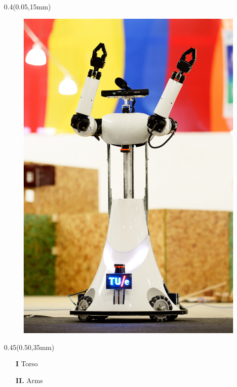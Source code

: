 \documentclass[aspectratio=43]{beamer}
\newcommand{\TULeftMargin}{0.05\paperwidth}
\newcommand{\TULeftWidth}{0.4\paperwidth}
\newcommand{\TURightMargin}{0.50\paperwidth}
\newcommand{\TURightWidth}{0.45\paperwidth}
\begin{document}
	\begin{frame}
	
		\begin{textblock*}{\TULeftWidth}(\TULeftMargin,15mm)
			\begin{figure}
				\centering
				\includegraphics[width=0.8\linewidth]{[TechUnitedStyle]/Figures/Arms}
			\end{figure}
		\end{textblock*}
		
	\begin{textblock*}{\TURightWidth}(\TURightMargin,35mm)
		
			\begin{itemize}
				\item[\textcolor{TechUnitedGreen}{\textbf{I}}] Torso
				
				\item[\textcolor{TechUnitedGreen}{\textbf{II.}}] Arms
			\end{itemize}
	\end{textblock*}	
	
	\end{frame}
	
\end{document}
